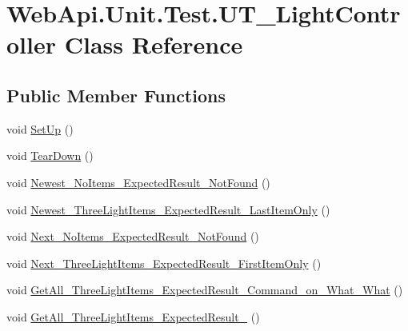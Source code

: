 \hypertarget{class_web_api_1_1_unit_1_1_test_1_1_u_t___light_controller}{}\section{Web\+Api.\+Unit.\+Test.\+U\+T\+\_\+\+Light\+Controller Class Reference}
\label{class_web_api_1_1_unit_1_1_test_1_1_u_t___light_controller}
\subsection*{Public Member Functions}
\begin{DoxyCompactItemize}
\item 
void \mbox{\hyperlink{class_web_api_1_1_unit_1_1_test_1_1_u_t___light_controller_a15ce3dad7777fd2e738696c9a10cd44c}{Set\+Up}} ()
\item 
void \mbox{\hyperlink{class_web_api_1_1_unit_1_1_test_1_1_u_t___light_controller_a74304aa3a1428333847f1a08d5e0092b}{Tear\+Down}} ()
\item 
void \mbox{\hyperlink{class_web_api_1_1_unit_1_1_test_1_1_u_t___light_controller_a6260eda6d80068985f2d49a9311b0fb1}{Newest\+\_\+\+No\+Items\+\_\+\+Expected\+Result\+\_\+\+Not\+Found}} ()
\item 
void \mbox{\hyperlink{class_web_api_1_1_unit_1_1_test_1_1_u_t___light_controller_a312beb1c7d92ba23b685330b9171a91b}{Newest\+\_\+\+Three\+Light\+Items\+\_\+\+Expected\+Result\+\_\+\+Last\+Item\+Only}} ()
\item 
void \mbox{\hyperlink{class_web_api_1_1_unit_1_1_test_1_1_u_t___light_controller_a58e2aabf826b30fb0e5fed530b777040}{Next\+\_\+\+No\+Items\+\_\+\+Expected\+Result\+\_\+\+Not\+Found}} ()
\item 
void \mbox{\hyperlink{class_web_api_1_1_unit_1_1_test_1_1_u_t___light_controller_a7369c99b1ee9dd83d1539fcadab8b61c}{Next\+\_\+\+Three\+Light\+Items\+\_\+\+Expected\+Result\+\_\+\+First\+Item\+Only}} ()
\item 
void \mbox{\hyperlink{class_web_api_1_1_unit_1_1_test_1_1_u_t___light_controller_aaa66416e3d90d27105e0c023198faeb2}{Get\+All\+\_\+\+Three\+Light\+Items\+\_\+\+Expected\+Result\+\_\+\+Command\+\_\+on\+\_\+\+What\+\_\+\+What}} ()
\item 
void \mbox{\hyperlink{class_web_api_1_1_unit_1_1_test_1_1_u_t___light_controller_a0b19452e73eec94b5de82b00e8473f8c}{Get\+All\+\_\+\+Three\+Light\+Items\+\_\+\+Expected\+Result\+\_}} ()
\item 

\end{DoxyCompactItemize}
